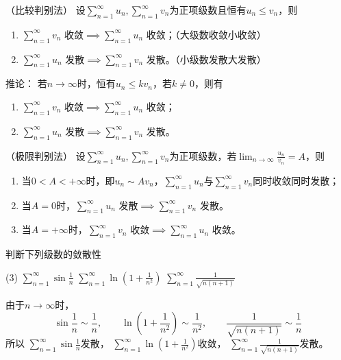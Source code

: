 \begin{theorem}
    （比较判别法）
    \label{th:级数比较判别法}
    设$\displaystyle\sum_{n=1}^\infty u_n,\sum_{n=1}^\infty v_n$为正项级数且恒有$u_n\leq v_n$，则
    \begin{enumerate}[(1)]
        \item $\displaystyle \sum_{n=1}^\infty v_n\text{ 收敛}\implies\sum_{n=1}^\infty u_n\text{ 收敛}$；（大级数收敛小收敛）
        \item $\displaystyle \sum_{n=1}^\infty u_n\text{ 发散}\implies\sum_{n=1}^\infty v_n\text{ 发散}$。（小级数发散大发散）
    \end{enumerate}
    推论：
    若$n\to\infty$时，恒有$u_n\leq kv_n$，若$k\neq 0$，则有
    \begin{enumerate}[(1)]
        \item $\displaystyle \sum_{n=1}^\infty v_n\text{ 收敛}\implies\sum_{n=1}^\infty u_n\text{ 收敛}$；
        \item $\displaystyle \sum_{n=1}^\infty u_n\text{ 发散}\implies\sum_{n=1}^\infty v_n\text{ 发散}$。
    \end{enumerate}
\end{theorem}

\begin{theorem}
    （极限判别法）
    \label{th:级数极限判别法}
    设$\displaystyle\sum_{n=1}^\infty u_n,\sum_{n=1}^\infty v_n$为正项级数，若$\displaystyle\lim_{n\to\infty}\frac{u_n}{v_n}=A$，则
    \begin{enumerate}[(1)]
        \item 当$0<A<+\infty$时，即$u_n\sim Av_n$，$\displaystyle\sum_{n=1}^\infty u_n$与$\displaystyle\sum_{n=1}^\infty v_n$同时收敛同时发散；
        \item 当$A=0$时，$\displaystyle\sum_{n=1}^\infty u_n\text{ 发散}\implies\sum_{n=1}^\infty v_n\text{ 发散}$。
        \item 当$A=+\infty$时，$\displaystyle\sum_{n=1}^\infty v_n\text{ 收敛}\implies\sum_{n=1}^\infty u_n\text{ 收敛}$。
    \end{enumerate}
\end{theorem}

\begin{example}
    判断下列级数的敛散性
    \begin{tasks}[label=(\arabic*),label-width = 2em](3)
        \task $\displaystyle \sum_{n=1}^\infty \sin\frac{1}{n}$
        \task $\displaystyle \sum_{n=1}^\infty \ln\left(1+\frac{1}{n^2}\right)$
        \task $\displaystyle \sum_{n=1}^\infty \frac{1}{\sqrt{n(n+1)}}$
    \end{tasks}
\end{example}
\begin{solution}
    由于$n\to\infty$时，
    \[
        \sin\frac{1}{n} \sim \frac{1}{n}, \qquad
        \ln\left(1+\frac{1}{n^2}\right) \sim \frac{1}{n^2}, \qquad
        \frac{1}{\sqrt{n(n+1)}} \sim \frac{1}{n}
    \]
    所以
    $\displaystyle \sum_{n=1}^\infty \sin\frac{1}{n}$发散，
    $\displaystyle \sum_{n=1}^\infty \ln\left(1+\frac{1}{n^2}\right)$收敛，
    $\displaystyle \sum_{n=1}^\infty \frac{1}{\sqrt{n(n+1)}}$发散。
\end{solution}

